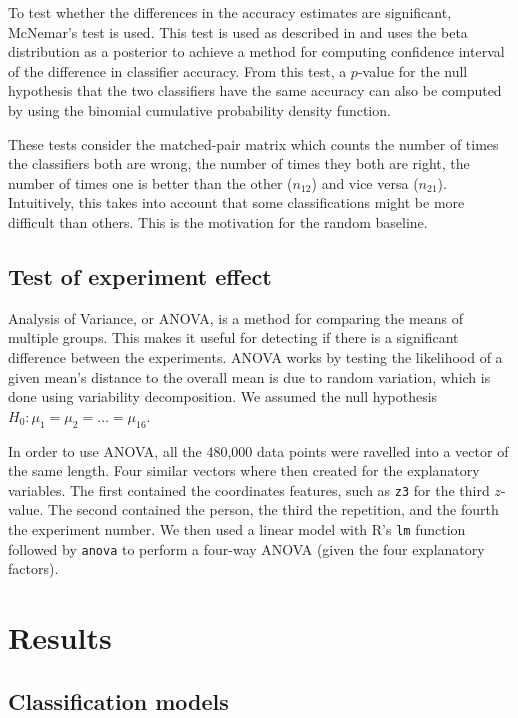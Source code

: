 \documentclass[11pt,fleqn]{article}
\begin{document}
To test whether the differences in the accuracy estimates are significant, McNemar's test is used. 
This test is used as described in \cite[Method 11.3.2]{Tue} and uses the beta distribution as a posterior to achieve a method for computing confidence interval of the difference in classifier accuracy.
From this test, a \(p\)-value for the null hypothesis that the two classifiers have the same accuracy can also be computed by using the binomial cumulative probability density function.

These tests consider the matched-pair matrix which counts the number of times the classifiers both are wrong, the number of times they both are right, the number of times one is better than the other (\(n_{12}\)) and vice versa (\(n_{21}\)).
Intuitively, this takes into account that some classifications might be more difficult than others. 
This is the motivation for the random baseline.
\subsection{Test of experiment effect}\label{subsec:expeffect}
Analysis of Variance, or ANOVA, is a method for comparing the means of multiple groups.
This makes it useful for detecting if there is a significant difference between the experiments.
ANOVA works by testing the likelihood of a given mean's distance to the overall mean is due to random variation, which is done using variability decomposition.
We assumed the null hypothesis $ H_0: \mu_1=\mu_2=\ldots=\mu_{16} $.

In order to use ANOVA, all the 480,000 data points were ravelled into a vector of the same length.
Four similar vectors where then created for the explanatory variables.
The first contained the coordinates features, such as \texttt{z3} for the third $ z $-value.
The second contained the person, the third the repetition, and the fourth the experiment number.
We then used a linear model with R's \texttt{lm} function followed by \texttt{anova} to perform a four-way ANOVA (given the four explanatory factors).



\section{Results}

\subsection{Classification models}
\end{document}
